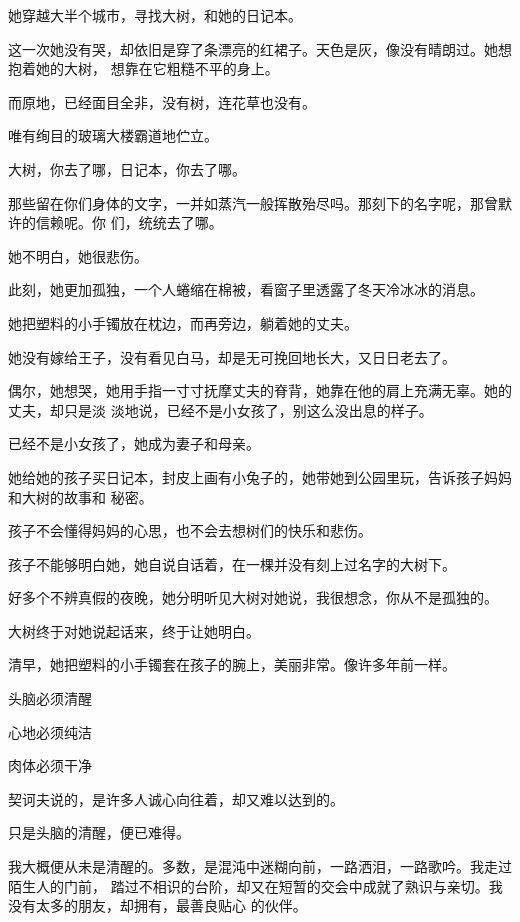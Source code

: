 \documentclass[12pt,a4paper]{article}
\begin{document}
		她穿越大半个城市，寻找大树，和她的日记本。

		这一次她没有哭，却依旧是穿了条漂亮的红裙子。天色是灰，像没有晴朗过。她想抱着她的大树，
	想靠在它粗糙不平的身上。

		而原地，已经面目全非，没有树，连花草也没有。

		唯有绚目的玻璃大楼霸道地伫立。


		大树，你去了哪，日记本，你去了哪。

		那些留在你们身体的文字，一并如蒸汽一般挥散殆尽吗。那刻下的名字呢，那曾默许的信赖呢。你
	们，统统去了哪。


		她不明白，她很悲伤。

		此刻，她更加孤独，一个人蜷缩在棉被，看窗子里透露了冬天冷冰冰的消息。

		她把塑料的小手镯放在枕边，而再旁边，躺着她的丈夫。

		她没有嫁给王子，没有看见白马，却是无可挽回地长大，又日日老去了。

		偶尔，她想哭，她用手指一寸寸抚摩丈夫的脊背，她靠在他的肩上充满无辜。她的丈夫，却只是淡
	淡地说，已经不是小女孩了，别这么没出息的样子。

		已经不是小女孩了，她成为妻子和母亲。

		她给她的孩子买日记本，封皮上画有小兔子的，她带她到公园里玩，告诉孩子妈妈和大树的故事和
	秘密。

		孩子不会懂得妈妈的心思，也不会去想树们的快乐和悲伤。

		孩子不能够明白她，她自说自话着，在一棵并没有刻上过名字的大树下。


		好多个不辨真假的夜晚，她分明听见大树对她说，我很想念，你从不是孤独的。

		大树终于对她说起话来，终于让她明白。


		清早，她把塑料的小手镯套在孩子的腕上，美丽非常。像许多年前一样。

	\endwriting



		头脑必须清醒 \par
		心地必须纯洁 \par
		肉体必须干净

		契诃夫说的，是许多人诚心向往着，却又难以达到的。\par
		只是头脑的清醒，便已难得。

		我大概便从未是清醒的。多数，是混沌中迷糊向前，一路洒泪，一路歌吟。我走过陌生人的门前，
	踏过不相识的台阶，却又在短暂的交会中成就了熟识与亲切。我没有太多的朋友，却拥有，最善良贴心
	的伙伴。
\end{document}
